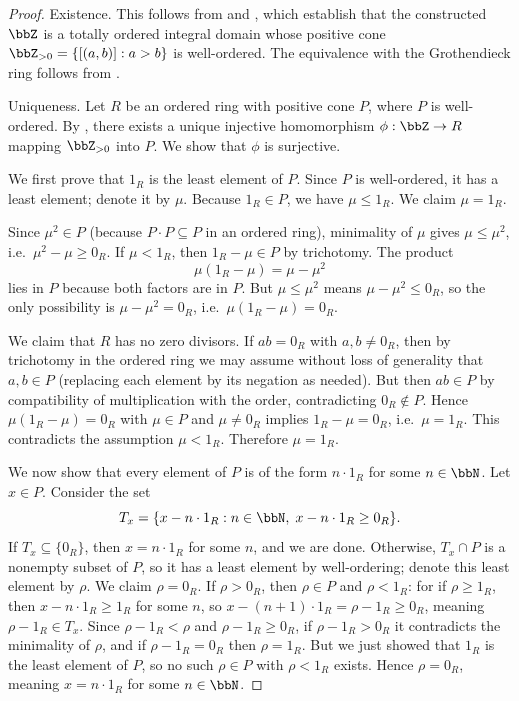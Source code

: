 \begin{proof}
    Existence. This follows from  and , which establish that the constructed $\bbZ$ is a totally ordered integral domain whose positive cone $\bbZ_{> 0} = \{[(a,b)] : a > b\}$ is well-ordered. The equivalence with the Grothendieck ring follows from .

    Uniqueness. Let $R$ be an ordered ring with positive cone $P$, where $P$ is well-ordered. By , there exists a unique injective homomorphism $\phi: \bbZ \to R$ mapping $\bbZ_{> 0}$ into $P$. We show that $\phi$ is surjective.

    We first prove that $1_R$ is the least element of $P$. Since $P$ is well-ordered, it has a least element; denote it by $\mu$. Because $1_R \in P$, we have $\mu \leq 1_R$. We claim $\mu = 1_R$.

    Since $\mu^2 \in P$ (because $P \cdot P \subseteq P$ in an ordered ring), minimality of $\mu$ gives $\mu \leq \mu^2$, i.e.\ $\mu^2 - \mu \geq 0_R$. If $\mu < 1_R$, then $1_R - \mu \in P$ by trichotomy. The product
    $$\mu(1_R - \mu) = \mu - \mu^2$$
    lies in $P$ because both factors are in $P$. But $\mu \leq \mu^2$ means $\mu - \mu^2 \leq 0_R$, so the only possibility is $\mu - \mu^2 = 0_R$, i.e.\ $\mu(1_R - \mu) = 0_R$.

    We claim that $R$ has no zero divisors. If $ab = 0_R$ with $a, b \neq 0_R$, then by trichotomy in the ordered ring we may assume without loss of generality that $a, b \in P$ (replacing each element by its negation as needed). But then $ab \in P$ by compatibility of multiplication with the order, contradicting $0_R \notin P$. Hence $\mu(1_R - \mu) = 0_R$ with $\mu \in P$ and $\mu \neq 0_R$ implies $1_R - \mu = 0_R$, i.e.\ $\mu = 1_R$. This contradicts the assumption $\mu < 1_R$. Therefore $\mu = 1_R$.

    We now show that every element of $P$ is of the form $n \cdot 1_R$ for some $n \in \bbN$. Let $x \in P$. Consider the set
    $$T_x = \{x - n \cdot 1_R : n \in \bbN,\; x - n \cdot 1_R \geq 0_R\}.$$
    If $T_x \subseteq \{0_R\}$, then $x = n \cdot 1_R$ for some $n$, and we are done. Otherwise, $T_x \cap P$ is a nonempty subset of $P$, so it has a least element by well-ordering; denote this least element by $\rho$. We claim $\rho = 0_R$. If $\rho > 0_R$, then $\rho \in P$ and $\rho < 1_R$: for if $\rho \geq 1_R$, then $x - n \cdot 1_R \geq 1_R$ for some $n$, so $x - (n+1) \cdot 1_R = \rho - 1_R \geq 0_R$, meaning $\rho - 1_R \in T_x$. Since $\rho - 1_R < \rho$ and $\rho - 1_R \geq 0_R$, if $\rho - 1_R > 0_R$ it contradicts the minimality of $\rho$, and if $\rho - 1_R = 0_R$ then $\rho = 1_R$. But we just showed that $1_R$ is the least element of $P$, so no such $\rho \in P$ with $\rho < 1_R$ exists. Hence $\rho = 0_R$, meaning $x = n \cdot 1_R$ for some $n \in \bbN$.


\end{proof}
